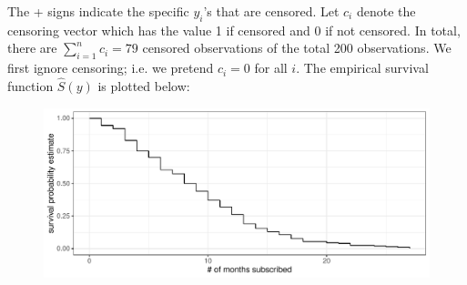\documentclass[12pt]{article}
\begin{document}
\noindent The + signs indicate the specific $y_i$'s that are censored. Let $c_i$ denote the censoring vector which has the value 1 if censored and 0 if not censored. In total, there are $\sum_{i=1}^n c_i = 79$ censored observations of the total 200 observations. We first ignore censoring; i.e. we pretend $c_i = 0$ for all $i$. The empirical survival function $\hat{S}(y)$ is plotted below:

\begin{figure}[htp]
\centering
\includegraphics[width=5.5in]{survival_censoring_ignored}
\end{figure}
\end{document}

